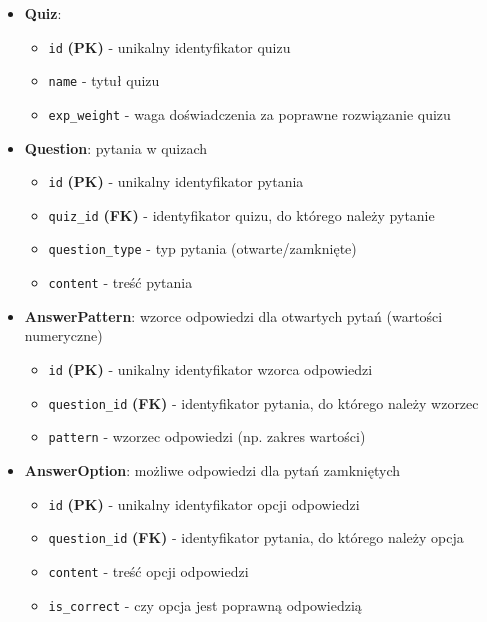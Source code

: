 \documentclass[11pt,a4paper]{article}
\numberwithin{equation}{section}
\begin{document}
\begin{itemize}
\begin{itemize}
        \end{itemize}
    \item \textbf{Quiz}: 
        \begin{itemize}
            \item \texttt{id} \textbf{(PK)} - unikalny identyfikator quizu
            \item \texttt{name} - tytuł quizu
            \item \texttt{exp\_weight} - waga doświadczenia za poprawne rozwiązanie quizu
        \end{itemize}
    \item \textbf{Question}: pytania w quizach
        \begin{itemize}
            \item \texttt{id} \textbf{(PK)} - unikalny identyfikator pytania
            \item \texttt{quiz\_id} \textbf{(FK)} - identyfikator quizu, do którego należy pytanie
            \item \texttt{question\_type} - typ pytania (otwarte/zamknięte)
            \item \texttt{content} - treść pytania
        \end{itemize}
    \item \textbf{AnswerPattern}: wzorce odpowiedzi dla otwartych pytań (wartości numeryczne)
        \begin{itemize}
            \item \texttt{id} \textbf{(PK)} - unikalny identyfikator wzorca odpowiedzi
            \item \texttt{question\_id} \textbf{(FK)} - identyfikator pytania, do którego należy wzorzec
            \item \texttt{pattern} - wzorzec odpowiedzi (np. zakres wartości)
        \end{itemize}
    \item \textbf{AnswerOption}: możliwe odpowiedzi dla pytań zamkniętych
        \begin{itemize}
            \item \texttt{id} \textbf{(PK)} - unikalny identyfikator opcji odpowiedzi
            \item \texttt{question\_id} \textbf{(FK)} - identyfikator pytania, do którego należy opcja
            \item \texttt{content} - treść opcji odpowiedzi
            \item \texttt{is\_correct} - czy opcja jest poprawną odpowiedzią
        \end{itemize}

\end{itemize}
\end{document}
